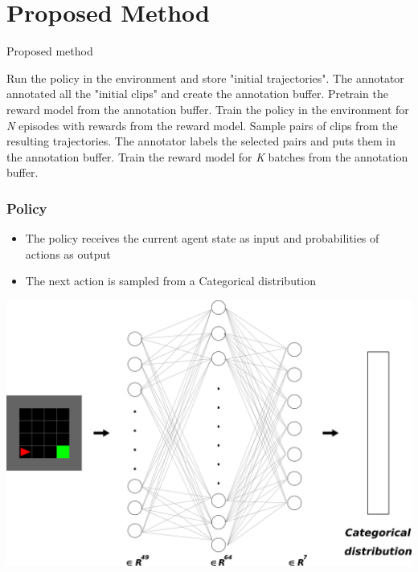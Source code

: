 \section{Proposed Method}

\begin{frame}{Proposed method}

\begin{algorithm}[H]
\caption{Training Protocol \footnote{\href{http://papers.nips.cc/paper/8025-reward-learning-from-human-preferences-and-demonstrations-in-atari}{}}}

\begin{algorithmic}[1]
\STATE Run the policy in the environment and store "initial trajectories".
\STATE The annotator annotated all the "initial clips" and create the annotation buffer.
\STATE Pretrain the reward model from the annotation buffer.
\STATE Train the policy in the environment for \textit{N} episodes with rewards from the reward model.
\STATE Sample pairs of clips from the resulting trajectories.
\STATE The annotator labels the selected pairs and puts them in the annotation buffer.
\STATE Train the reward model for \textit{K} batches from the annotation buffer.
\ENDFOR 
\end{algorithmic}
\end{algorithm}

\end{frame}

\begin{frame}
\frametitle{Policy}

\begin{itemize}
    
    \item The policy receives the current agent state as input and probabilities of actions as output
    \item The next action is sampled from a Categorical distribution    
\end{itemize}

\centering
\includegraphics[width=0.6\linewidth]{images/policy.png}

\end{frame}

